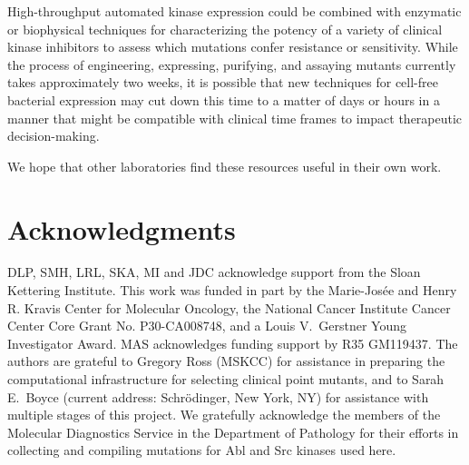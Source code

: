 \documentclass[9pt,lineno]{elife}
\begin{document}
High-throughput automated kinase expression could be combined with enzymatic or biophysical techniques for characterizing the potency of a variety of clinical kinase inhibitors to assess which mutations confer resistance or sensitivity.
While the process of engineering, expressing, purifying, and assaying mutants currently takes approximately two weeks, it is possible that new techniques for cell-free bacterial expression%
may cut down this time to a matter of days or hours in a manner that might be compatible with clinical time frames to impact therapeutic decision-making.

We hope that other laboratories find these resources useful in their own work.

\section{Acknowledgments}

DLP, SMH, LRL, SKA, MI and JDC acknowledge support from the Sloan Kettering Institute.
This work was funded in part by the Marie-Josée and Henry R. Kravis Center for Molecular Oncology, the National Cancer Institute Cancer Center Core Grant No. P30-CA008748, and a Louis V.~Gerstner Young Investigator Award. MAS acknowledges funding support by R35 GM119437. 
The authors are grateful to Gregory Ross (MSKCC) for assistance in preparing the computational infrastructure for selecting clinical point mutants, and to Sarah E.~Boyce (current address: Schr\"{o}dinger, New York, NY) for assistance with multiple stages of this project.
We gratefully acknowledge the members of the Molecular Diagnostics Service in the Department of Pathology for their efforts in collecting and compiling mutations for Abl and Src kinases used here.

% 

\end{document}

